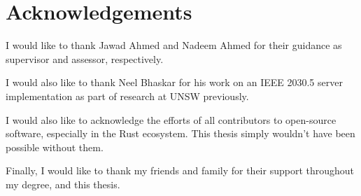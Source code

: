 \chapter*{Acknowledgements}\label{Acknowledgements}
I would like to thank Jawad Ahmed and Nadeem Ahmed for their guidance as supervisor and assessor, respectively.

I would also like to thank Neel Bhaskar for his work on an IEEE 2030.5 server implementation as part of research at UNSW previously.

I would also like to acknowledge the efforts of all contributors to open-source software, especially in the Rust ecosystem. This thesis simply wouldn't have been possible without them.

Finally, I would like to thank my friends and family for their support throughout my degree, and this thesis.

